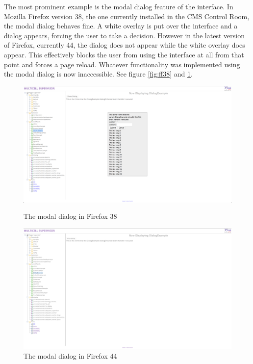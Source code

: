 The most prominent example is the modal dialog feature of the interface.
In Mozilla Firefox version 38, the one currently installed in the CMS Control
Room, the modal dialog behaves fine. A white overlay is put over the interface
and a dialog appears, forcing the user to take a decision.
However in the latest version of Firefox, currently 44, the dialog does not appear
while the white overlay does appear. This effectively blocks the user from using
the interface at all from that point and forces a page reload.
Whatever functionality was implemented using the modal dialog is now inaccessible.
See figure \ref{fig:ff38} and \ref{fig:ff44}.
\begin{figure}
  \centering
  \begin{minipage}[b]{0.49\textwidth}
    \includegraphics[width=\textwidth]{images/modal_ff38}
    \caption{The modal dialog in Firefox 38}
    \label{fig:ff38}
  \end{minipage}
  \hfill
  \begin{minipage}[b]{0.49\textwidth}
    \includegraphics[width=\textwidth]{images/modal_ff44}
    \caption{The modal dialog in Firefox 44}
    \label{fig:ff44}
  \end{minipage}
\end{figure}


